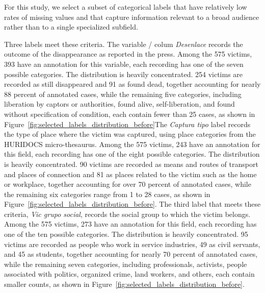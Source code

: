 \documentclass{article}
\begin{document}
For this study, we select a subset of categorical labels that have relatively low rates of missing values and that capture information relevant to a broad audience rather than to a single specialized subfield.

Three labels meet these criteria. The variable / colum \emph{Desenlace} records the outcome of the disappearance as reported in the press. Among the 575 victims, 393 have an annotation for this variable, each recording has one of the seven possible categories. The distribution is heavily concentrated. 254 victims are recorded as still disappeared and 91 as found dead, together accounting for nearly 88 percent of annotated cases, while the remaining five categories, including liberation by captors or authorities, found alive, self-liberation, and found without specification of condition, each contain fewer than 25 cases, as shown in Figure~\ref{fig:selected_labels_distribution_before}The \emph{Captura tipo} label records the type of place where the victim was captured, using place categories from the HURIDOCS micro-thesaurus. Among the 575 victims, 243 have an annotation for this field, each recording has one of the eight possible categories. The distribution is heavily concentrated. 90 victims are recorded as means and routes of transport and places of connection and 81 as places related to the victim such as the home or workplace, together accounting for over 70 percent of annotated cases, while the remaining six categories range from 1 to 28 cases, as shown in Figure~\ref{fig:selected_labels_distribution_before}. The third label that meets these criteria, \emph{Vic grupo social}, records the social group to which the victim belongs. Among the 575 victims, 273 have an annotation for this field, each recording has one of the ten possible categories. The distribution is heavily concentrated. 95 victims are recorded as people who work in service industries, 49 as civil servants, and 45 as students, together accounting for nearly 70 percent of annotated cases, while the remaining seven categories, including professionals, activists, people associated with politics, organized crime, land workers, and others, each contain smaller counts, as shown in Figure~\ref{fig:selected_labels_distribution_before}.

\end{document}

